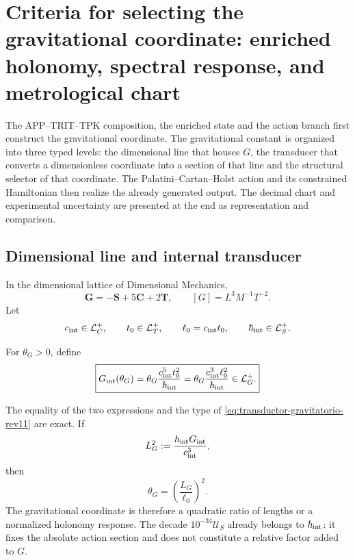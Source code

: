 \section[Structural Criteria and Metrological Chart of \(G\)]{Criteria for selecting the gravitational coordinate: enriched holonomy, spectral
response, and metrological chart}
\label{sec:selector-gravitatorio-rev11}

The APP--TRIT--TPK composition, the enriched state and the action branch
first construct the gravitational coordinate. The gravitational constant is
organized into three typed levels: the dimensional line that houses \(G\), the
transducer that converts a dimensionless coordinate into a section of that
line and the structural selector of that coordinate. The
Palatini--Cartan--Holst action and its constrained Hamiltonian then realize the
already generated output. The decimal chart and experimental uncertainty are
presented at the end as representation and comparison.

\subsection{Dimensional line and internal transducer}

In the dimensional lattice of Dimensional Mechanics,
\[
 \mathbf G=-\mathbf S+5\mathbf C+2\mathbf T,
 \qquad [G]=L^3M^{-1}T^{-2}.
\]
Let
\[
 c_{\rm int}\in\mathcal L_C^+,
 \qquad t_0\in\mathcal L_T^+,
 \qquad \ell_0=c_{\rm int}t_0,
 \qquad \hbar_{\rm int}\in\mathcal L_S^+.
\]

\begin{definition}
\label{def:transductor-gravitatorio-rev11}
For \(\theta_G>0\), define
\begin{equation}
 \boxed{
 G_{\rm int}(\theta_G)
 =\theta_G\frac{c_{\rm int}^{5}t_0^2}{\hbar_{\rm int}}
 =\theta_G\frac{c_{\rm int}^{3}\ell_0^2}{\hbar_{\rm int}}
 \in\mathcal L_G^+.}
 \label{eq:transductor-gravitatorio-rev11}
\end{equation}
\end{definition}

The equality of the two expressions and the type of
\eqref{eq:transductor-gravitatorio-rev11} are exact. If
\[
 L_G^2:=\frac{\hbar_{\rm int}G_{\rm int}}{c_{\rm int}^3},
\]
then
\begin{equation}
 \theta_G=\left(\frac{L_G}{\ell_0}\right)^2.
 \label{eq:thetaG-razon-longitudes-rev11}
\end{equation}
The gravitational coordinate is therefore a quadratic ratio of lengths
or a normalized holonomy response. The decade
\(10^{-34}\mathcal U_S\) already belongs to \(\hbar_{\rm int}\): it fixes the absolute
action section and does not constitute a relative factor added to \(G\).

